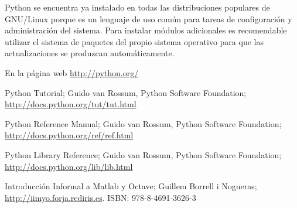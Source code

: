 \documentclass[a4paper,10pt]{article}
\begin{document}
Python se encuentra ya instalado en todas las distribuciones populares
de GNU/Linux porque es un lenguaje de uso común para tareas de
configuración y administración del sistema.  Para instalar módulos
adicionales es recomendable utilizar el sistema de paquetes del propio
sistema operativo para que las actualizaciones se produzcan
automáticamente.

En la página web \url{http://python.org/}


\begin{thebibliography}{99}

  Python Tutorial; Guido van Rossum, Python Software Foundation;
  \newblock \url{http://docs.python.org/tut/tut.html}

  Python Reference Manual; Guido van Rossum, Python Software Foundation;
  \newblock \url{http://docs.python.org/ref/ref.html}

  Python Library Reference; Guido van Rossum, Python Software Foundation;
  \newblock \url{http://docs.python.org/lib/lib.html}

  Introducción Informal a Matlab y Octave; Guillem Borrell i Nogueras;
  \newblock \url{http://iimyo.forja.rediris.es}. ISBN: 978-8-4691-3626-3

\end{thebibliography}
\end{document}

